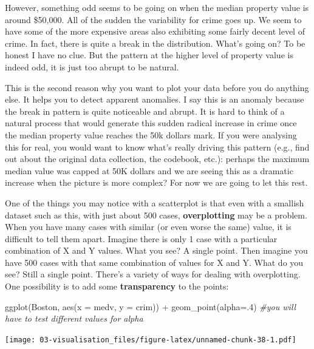 \documentclass[
]{book}
\newenvironment{Shaded}{\begin{snugshade}}{\end{snugshade}}
\newcommand{\AttributeTok}[1]{\textcolor[rgb]{0.77,0.63,0.00}{#1}}
\newcommand{\CommentTok}[1]{\textcolor[rgb]{0.56,0.35,0.01}{\textit{#1}}}
\newcommand{\DecValTok}[1]{\textcolor[rgb]{0.00,0.00,0.81}{#1}}
\newcommand{\FunctionTok}[1]{\textcolor[rgb]{0.00,0.00,0.00}{#1}}
\newcommand{\NormalTok}[1]{#1}
\newcommand{\SpecialCharTok}[1]{\textcolor[rgb]{0.00,0.00,0.00}{#1}}
\begin{document}
However, something odd seems to be going on when the median property value is around \$50,000. All of the sudden the variability for crime goes up. We seem to have some of the more expensive areas also exhibiting some fairly decent level of crime. In fact, there is quite a break in the distribution. What's going on? To be honest I have no clue. But the pattern at the higher level of property value is indeed odd, it is just too abrupt to be natural.

This is the second reason why you want to plot your data before you do anything else. It helps you to detect apparent anomalies. I say this is an anomaly because the break in pattern is quite noticeable and abrupt. It is hard to think of a natural process that would generate this sudden radical increase in crime once the median property value reaches the 50k dollars mark. If you were analysing this for real, you would want to know what's really driving this pattern (e.g., find out about the original data collection, the codebook, etc.): perhaps the maximum median value was capped at 50K dollars and we are seeing this as a dramatic increase when the picture is more complex? For now we are going to let this rest.

One of the things you may notice with a scatterplot is that even with a smallish dataset such as this, with just about 500 cases, \textbf{overplotting} may be a problem. When you have many cases with similar (or even worse the same) value, it is difficult to tell them apart. Imagine there is only 1 case with a particular combination of X and Y values. What you see? A single point. Then imagine you have 500 cases with that same combination of values for X and Y. What do you see? Still a single point. There's a variety of ways for dealing with overplotting. One possibility is to add some \textbf{transparency} to the points:

\begin{Shaded}
\begin{Highlighting}[]
\FunctionTok{ggplot}\NormalTok{(Boston, }\FunctionTok{aes}\NormalTok{(}\AttributeTok{x =}\NormalTok{ medv, }\AttributeTok{y =}\NormalTok{ crim)) }\SpecialCharTok{+}
  \FunctionTok{geom\_point}\NormalTok{(}\AttributeTok{alpha=}\NormalTok{.}\DecValTok{4}\NormalTok{) }\CommentTok{\#you will have to test different values for alpha}
\end{Highlighting}
\end{Shaded}

\texttt{[image: 03-visualisation\_files/figure-latex/unnamed-chunk-38-1.pdf]}
\end{document}
